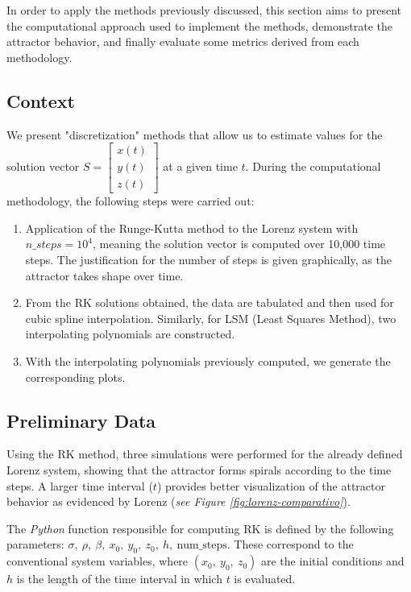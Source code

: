 \documentclass[12pt, a4paper]{article}
\begin{document}
	In order to apply the methods previously discussed, this section aims to present the computational approach used to implement the methods, demonstrate the attractor behavior, and finally evaluate some metrics derived from each methodology.
	
	\subsection{Context}
	
	We present "discretization" methods that allow us to estimate values for the solution vector $S = \begin{bmatrix} x(t) \\ y(t) \\ z(t)\end{bmatrix}$ at a given time $t$. During the computational methodology, the following steps were carried out:
	
	\begin{enumerate}
		\item Application of the Runge-Kutta method to the Lorenz system with $n\_steps = 10^4$, meaning the solution vector is computed over 10,000 time steps. The justification for the number of steps is given graphically, as the attractor takes shape over time.
		\item From the RK solutions obtained, the data are tabulated and then used for cubic spline interpolation. Similarly, for LSM (Least Squares Method), two interpolating polynomials are constructed.
		\item With the interpolating polynomials previously computed, we generate the corresponding plots.
	\end{enumerate}
	
	\subsection{Preliminary Data}
	
	Using the RK method, three simulations were performed for the already defined Lorenz system, showing that the attractor forms spirals according to the time steps. A larger time interval ($t$) provides better visualization of the attractor behavior as evidenced by Lorenz (\textit{see Figure \ref{fig:lorenz-comparativo}}).
	
	The \textit{Python} function responsible for computing RK is defined by the following parameters: $\sigma,\ \rho,\ \beta,\ x_0,\ y_0,\ z_0,\ h,\ \text{num\_steps}$. These correspond to the conventional system variables, where $(x_0,\ y_0,\ z_0)$ are the initial conditions and $h$ is the length of the time interval in which $t$ is evaluated.
	
\end{document}
